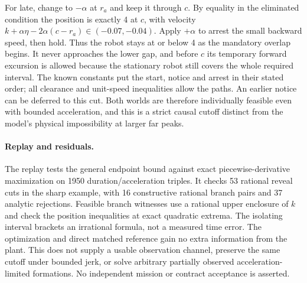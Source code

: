 \documentclass[11pt]{article}
\begin{document}
For late, change to \(-\alpha\) at \(r_a\) and keep it through
\(c\). By equality in the eliminated condition the position
is exactly 4 at \(c\), with velocity \(k+\alpha\eta
-2\alpha(c-r_a)\in(-0.07,-0.04)\). Apply \(+\alpha\) to arrest the
small backward speed, then hold. Thus the robot stays at or
below 4 as the mandatory overlap begins. It never approaches
the lower gap, and before \(c\) its temporary forward excursion
is allowed because the stationary robot still covers the
whole required interval. The known constants put the start,
notice and arrest in their stated order; all clearance and
unit-speed inequalities allow the paths.
An earlier notice can be deferred to this cut. Both worlds
are therefore individually feasible even with bounded
acceleration, and this is a strict causal cutoff distinct
from the model's physical impossibility at larger far peaks.

\paragraph{Replay and residuals.}
The replay tests the general endpoint bound against exact
piecewise-derivative maximization on 1950 duration/acceleration
triples. It checks 53 rational reveal cuts in the sharp
example, with 16 constructive rational branch pairs and 37
analytic rejections. Feasible branch witnesses use a rational
upper enclosure of \(k\) and check the position inequalities
at exact quadratic extrema. The isolating interval brackets an
irrational formula, not a measured time error. The optimization
and direct matched reference gain no extra information from the
plant. This does not supply a usable observation channel, preserve
the same cutoff under bounded jerk, or solve arbitrary partially
observed acceleration-limited formations. No independent
mission or contract acceptance is asserted.
\end{document}

